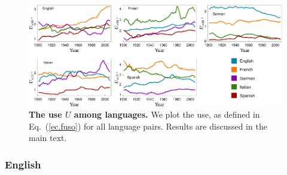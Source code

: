 \documentclass[10pt,letterpaper]{article} %
\newcommand{\eref}[1]{Eq.~(\ref{#1})}
\begin{document}



\begin{figure}[!h]
	\begin{adjustwidth}{-2cm}{1cm}
		\centering
		\includegraphics{images/usoFinal.pdf}
		\caption{{\bf The use $U$ among languages.} 
We plot the use, as defined in \eref{ec.fuso} for all language pairs. 
Results are discussed in the
main text. }
		\label{fig.UT_art}
	\end{adjustwidth}
\end{figure}
\subsubsection*{English} %
\end{document}
